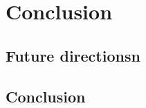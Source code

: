 
\chapter{Conclusion}\label{chapter:conclusion}

\section{Future directionsn}

\section{Conclusion}

